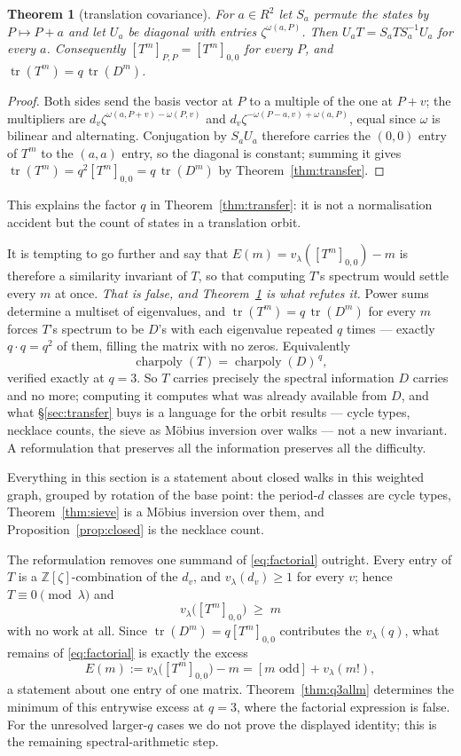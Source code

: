 \documentclass[11pt]{article}
\theoremstyle{plain}
\newtheorem{theorem}{Theorem}
\theoremstyle{definition}
\newcommand{\ZZ}{\mathbb Z}
\newcommand{\tr}{\operatorname{tr}}
\newcommand{\vlam}{v_\lambda}
\begin{document}
\begin{theorem}[translation covariance]\label{thm:cov}
For $a\in R^2$ let $S_a$ permute the states by $P\mapsto P+a$ and let $U_a$ be
diagonal with entries $\zeta^{\omega(a,P)}$. Then $U_aT=S_aTS_a^{-1}U_a$ for
every $a$. Consequently $[T^m]_{P,P}=[T^m]_{0,0}$ for every $P$, and
$\tr(T^m)=q\,\tr(D^m)$.
\end{theorem}

\begin{proof}
Both sides send the basis vector at $P$ to a multiple of the one at $P+v$; the
multipliers are $d_v\zeta^{\omega(a,P+v)-\omega(P,v)}$ and
$d_v\zeta^{-\omega(P-a,v)+\omega(a,P)}$, equal since $\omega$ is bilinear and
alternating. Conjugation by $S_aU_a$ therefore carries the $(0,0)$ entry of
$T^m$ to the $(a,a)$ entry, so the diagonal is constant; summing it gives
$\tr(T^m)=q^2[T^m]_{0,0}=q\,\tr(D^m)$ by Theorem~\ref{thm:transfer}.
\end{proof}

\noindent This explains the factor $q$ in Theorem~\ref{thm:transfer}: it is not
a normalisation accident but the count of states in a translation orbit.

It is tempting to go further and say that $E(m)=\vlam([T^m]_{0,0})-m$ is
therefore a similarity invariant of $T$, so that computing $T$'s spectrum would
settle every $m$ at once. \emph{That is false, and Theorem~\ref{thm:cov} is
what refutes it.} Power sums determine a multiset of eigenvalues, and
$\tr(T^m)=q\,\tr(D^m)$ for every $m$ forces $T$'s spectrum to be $D$'s with
each eigenvalue repeated $q$ times --- exactly $q\cdot q=q^2$ of them, filling
the matrix with no zeros. Equivalently
\[
\operatorname{charpoly}(T)=\operatorname{charpoly}(D)^{\,q},
\]
verified exactly at $q=3$. So $T$ carries precisely the spectral information
$D$ carries and no more; computing it computes what was already available from
$D$, and what \S\ref{sec:transfer} buys is a language for the orbit results ---
cycle types, necklace counts, the sieve as M\"obius inversion over walks --- not
a new invariant. A reformulation that preserves all the information preserves
all the difficulty.

\noindent Everything in this section is a statement about closed walks in this
weighted graph, grouped by rotation of the base point: the period-$d$ classes
are cycle types, Theorem~\ref{thm:sieve} is a M\"obius inversion over them, and
Proposition~\ref{prop:closed} is the necklace count.

The reformulation removes one summand of \eqref{eq:factorial} outright. Every
entry of $T$ is a $\ZZ[\zeta]$-combination of the $d_v$, and $\vlam(d_v)\ge1$
for every $v$; hence $T\equiv0\pmod\lambda$ and
\[
\vlam\bigl([T^m]_{0,0}\bigr)\;\ge\;m
\]
with no work at all. Since $\tr(D^m)=q[T^m]_{0,0}$ contributes the $\vlam(q)$,
what remains of \eqref{eq:factorial} is exactly the excess
\[
E(m):=\vlam\bigl([T^m]_{0,0}\bigr)-m=[m\text{ odd}]+\vlam(m!) ,
\]
a statement about one entry of one matrix. Theorem~\ref{thm:q3allm} determines
the minimum of this entrywise excess at $q=3$, where the factorial expression
is false. For the unresolved larger-$q$ cases we do not prove the displayed
identity; this is the remaining spectral-arithmetic step.
\end{document}
